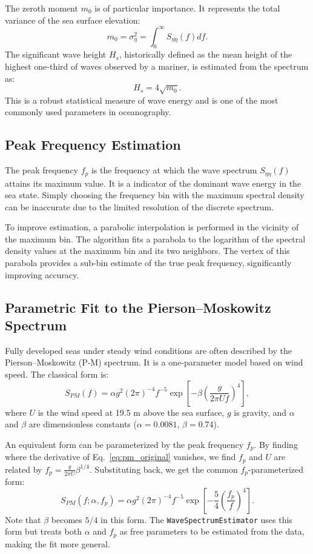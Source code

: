 \documentclass[11pt]{article}
\begin{document}
The zeroth moment $m_0$ is of particular importance. It represents the total variance of the sea surface elevation:
\begin{equation}
m_0 = \sigma_\eta^2 = \int_{0}^{\infty} S_{\eta\eta}(f)  df.
\end{equation}
The significant wave height $H_s$, historically defined as the mean height of the highest one-third of waves observed by a mariner, is estimated from the spectrum as:
\begin{equation}
H_s = 4\sqrt{m_0}.
\end{equation}
This is a robust statistical measure of wave energy and is one of the most commonly used parameters in oceanography.

\subsection{Peak Frequency Estimation}
The peak frequency $f_p$ is the frequency at which the wave spectrum $S_{\eta\eta}(f)$ attains its maximum value. It is a indicator of the dominant wave energy in the sea state. Simply choosing the frequency bin with the maximum spectral density can be inaccurate due to the limited resolution of the discrete spectrum.

To improve estimation, a parabolic interpolation is performed in the vicinity of the maximum bin. The algorithm fits a parabola to the logarithm of the spectral density values at the maximum bin and its two neighbors. The vertex of this parabola provides a sub-bin estimate of the true peak frequency, significantly improving accuracy.

\subsection{Parametric Fit to the Pierson--Moskowitz Spectrum}
\label{subsec:pmfit}
Fully developed seas under steady wind conditions are often described by the Pierson--Moskowitz (P-M) spectrum. It is a one-parameter model based on wind speed. The classical form is:
\begin{equation}
\label{eq:pm_original}
S_{PM}(f) = \alpha g^2 (2\pi)^{-4} f^{-5} \exp\left[-\beta\left(\frac{g}{2\pi U f}\right)^4\right],
\end{equation}
where $U$ is the wind speed at 19.5 m above the sea surface, $g$ is gravity, and $\alpha$ and $\beta$ are dimensionless constants ($\alpha=0.0081$, $\beta=0.74$).

An equivalent form can be parameterized by the peak frequency $f_p$. By finding where the derivative of Eq.~\ref{eq:pm_original} vanishes, we find $f_p$ and $U$ are related by $f_p = \frac{g}{2\pi U} \beta^{1/4}$. Substituting back, we get the common $f_p$-parameterized form:
\begin{equation}
\label{eq:pm_fp}
S_{PM}(f;\alpha, f_p) = \alpha g^2 (2\pi)^{-4} f^{-5} \exp\left[-\frac{5}{4}\left(\frac{f_p}{f}\right)^4\right].
\end{equation}
Note that $\beta$ becomes $5/4$ in this form. The \texttt{WaveSpectrumEstimator} uses this form but treats both $\alpha$ and $f_p$ as free parameters to be estimated from the data, making the fit more general.
\end{document}
